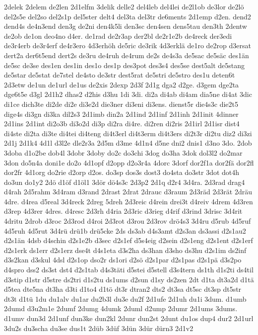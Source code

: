 {2delek
2delem
de2len
2d1elfm
3delik
delle2
del4leb
del4lei
de2l1ob
de3lor
de2lö
del2s5e
del2so
del2s1p
del5ster
delt4
del3ta
del3tr
de6ments
2d1emp
d2en.
dend2
dend4s
de4n3end
den3g
de2ni
den4k5li
den3sc
den4sen
dens5tau
den3th
2dentw
de2ob
de1on
deo4no
d4er.
de1rad
de2r3ap
der2bl
de2r1e2b
de4reck
der3edi
de3r4erb
de3r4erf
de4r3ero
4d3erhöh
de5ric
de3rik
4d3erklä
de1ro
de2rop
d3ersat
dert2a
der6t5end
dert2s
de3ru
de4ruh
de4rum
de2s
de4s3a
de5sac
de5säc
des1än
de5sc
de3se
des1en
des1in
des1o
des1p
des3pot
des3s4
des5se
dest5alt
de5stang
de5star
de5stat
de7stel
de4sto
de3str
dest5rat
de5stri
de5stro
des1u
deten6t
2d3etw
de1un
de1url
de1us
de2xis
2dexp
2d3f
2d1g
dga2
d2ge.
d3gem
dge2ta
dge6t5e
d3gl
2d1h2
dhas2
d2his
d3hu
1di
3di.
di2a
di4ab
di4am
dia5ne
di4at
3dic
di1ce
dich3te
di2de
di2e
di3e2d
die3ner
di3eni
di3ens.
dienst5r
die4s3c
die2t5
dige4s
di3gn
di3ka
dil2s3
2d1imb
din2a
2d1ind
2d1inf
2d1inh
2d1init
4dinner
2d1ins
2d1int
di2o3b
di3o2d
di3p
di2ra
di4re.
di2ren
di2ris
2d1irl
2d1isr
dist4
di4ste
di2ta
di3te
di4tei
di4teng
di4t3erl
di4t3erm
di4t3ers
di2t3r
di2tu
diz2
di3zi
2d1j
2d1k4
4d1l
d3l2e
dle2r3a
2d5m
d3me
4d1n4
d5ne
dni2
dnis1
d3no
3do.
2dob
3doba
d1o2be
dob4l
3dobr
3doby
do2c
do3chi
3dog
do3ha
3dok
dol3l2
do2mar
3don
do5n4a
doni1e
do2o
4d1opf
d2opp
d2o3r4a
4dorc
3dorf
dor2f1a
dor2fä
dor2fl
dor2fr
4d1org
do2rie
d2orp
d2os.
do3sp
dos3s
dost3
do4sta
do3str
3dot
dot4h
do3un
do1y2
2dö
d1öf
d1öl1
3dör
dö4s3c
2d3p2
2d1q
d2r4
3d4ra.
2d3rad
drag4
d4rah
2d5rahm
3d4ram
d3rand
2drast
2drat
2drauc
d3raum
2d3räd
2d3rät
2dräu
4dre.
d4rea
d5real
3d4reck
2dreg
5dreh
2d3reic
d4rein
drei3t
d4reiv
4drem
4d3ren
d3rep
4d3rer
4dres.
d4resc
2d3rh
d4ria
2d3ric
d3rieg
d4rif
d3rind
3drisc
3d4rit
4dritu
2drob
d3roc
2d3rod
d4roi
2d3rot
d3rou
2d3rov
drö4s3
3d4ru
d5rub
4d5ruf
4d5ruh
4d5rut
3d4rü
drü1b
drü5cke
2ds
ds3ab
d4s3amt
d2s3an
ds3assi
d2s1au2
d2s1än
4dsb
d4schin
d2s1e2b
d3sec
d2s1ef
d5s4eig
d2sein
d2s1eng
d2s1ent
d2s1erf
d2s1erk
ds1err
d2s1erz
dse4t
d4s1eta
d3s2ha
ds3han
d3sho
ds3hu
d2s1im
ds2inf
d3s2kan
d3skul
4dsl
d2s1op
dso2r
ds1ori
d2sö
d2s1par
d2s1pas
d2s1pä
d3s2po
d4spro
dss2
ds3st
dst4
d2s1tab
d4s3täti
d5stei
d5stell
d3s4tern
ds1th
d1s2ti
ds4til
d3stip
d1str
d5stre
ds2tri
d1s2tu
ds1ums
d2sun
d1sy
ds2zen
2dt
d1ta
dt3a2d
d1tä
d5tea
dte5na
dt3ha
d3ti
d1to4
d1tö
dt3r
dtran2
dts2
dt3sa
dt5sc
dt3sp
dt5str
dt3t
d1tü
1du
du1alv
du1ar
du2b3l
du3e
du2f
2d1ufe
2d1uh
du1i
3dum.
d1umb
2dumd
d3u2m1e
2dumf
2dumg
4dumk
2duml
d2ump
2dumr
2d1ums
3dums.
d1umv
dun3d
2d1unf
dun3ke
dun2kl
2dunr
dun2st
2dunt
du1os
dup4
dur2
2d1url
3du2s
du3scha
du3se
dus1t
2düb
3düf
3dün
3dür
dürn3
2d1v2
}
